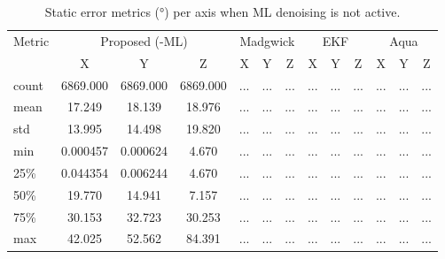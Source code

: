 \documentclass{iutbscthesis}
\begin{document}
\begin{table}[ht]
\centering
\caption{Static error metrics (°) per axis when ML denoising is not active.}
\label{tab:static_no_ml}
\begin{tabular}{l
  *{4}{ccc}
}
\toprule
Metric & \multicolumn{3}{c}{Proposed (-ML)} & \multicolumn{3}{c}{Madgwick} & \multicolumn{3}{c}{EKF} & \multicolumn{3}{c}{Aqua} \\
 & X & Y & Z & X & Y & Z & X & Y & Z & X & Y & Z \\
\midrule
count & 6869.000 & 6869.000 & 6869.000 & ... & ... & ... & ... & ... & ... & ... & ... & ... \\
mean & 17.249 & 18.139 & 18.976 & ... & ... & ... & ... & ... & ... & ... & ... & ... \\
std & 13.995 & 14.498 & 19.820 & ... & ... & ... & ... & ... & ... & ... & ... & ... \\
min & 0.000457 & 0.000624 & 4.670 & ... & ... & ... & ... & ... & ... & ... & ... & ... \\
25\% & 0.044354 & 0.006244 & 4.670 & ... & ... & ... & ... & ... & ... & ... & ... & ... \\
50\% & 19.770 & 14.941 & 7.157 & ... & ... & ... & ... & ... & ... & ... & ... & ... \\
75\% & 30.153 & 32.723 & 30.253 & ... & ... & ... & ... & ... & ... & ... & ... & ... \\
max & 42.025 & 52.562 & 84.391 & ... & ... & ... & ... & ... & ... & ... & ... & ... \\
\bottomrule
\end{tabular}
\end{table}
\end{document}
